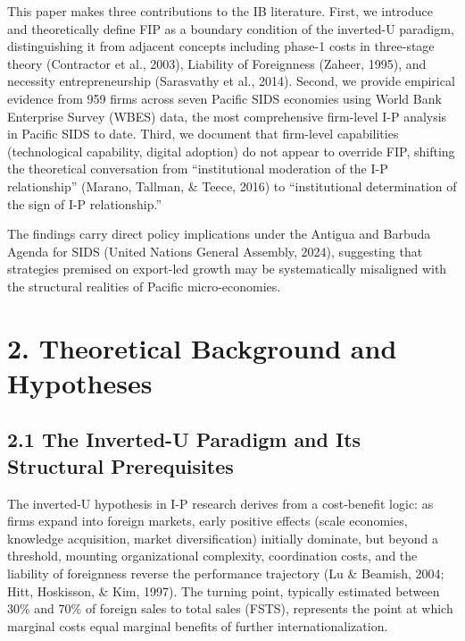 \documentclass[
  12pt]{article}
\begin{document}
This paper makes three contributions to the IB literature. First, we
introduce and theoretically define FIP as a boundary condition of the
inverted-U paradigm, distinguishing it from adjacent concepts including
phase-1 costs in three-stage theory (Contractor et al., 2003), Liability
of Foreignness (Zaheer, 1995), and necessity entrepreneurship
(Sarasvathy et al., 2014). Second, we provide empirical evidence from
959 firms across seven Pacific SIDS economies using World Bank
Enterprise Survey (WBES) data, the most comprehensive firm-level I-P
analysis in Pacific SIDS to date. Third, we document that firm-level
capabilities (technological capability, digital adoption) do not appear
to override FIP, shifting the theoretical conversation from
``institutional moderation of the I-P relationship'' (Marano, Tallman,
\& Teece, 2016) to ``institutional determination of the sign of I-P
relationship.''

The findings carry direct policy implications under the Antigua and
Barbuda Agenda for SIDS (United Nations General Assembly, 2024),
suggesting that strategies premised on export-led growth may be
systematically misaligned with the structural realities of Pacific
micro-economies.

\hypertarget{theoretical-background-and-hypotheses}{%
\section{2. Theoretical Background and
Hypotheses}\label{theoretical-background-and-hypotheses}}

\hypertarget{the-inverted-u-paradigm-and-its-structural-prerequisites}{%
\subsection{2.1 The Inverted-U Paradigm and Its Structural
Prerequisites}\label{the-inverted-u-paradigm-and-its-structural-prerequisites}}

The inverted-U hypothesis in I-P research derives from a cost-benefit
logic: as firms expand into foreign markets, early positive effects
(scale economies, knowledge acquisition, market diversification)
initially dominate, but beyond a threshold, mounting organizational
complexity, coordination costs, and the liability of foreignness reverse
the performance trajectory (Lu \& Beamish, 2004; Hitt, Hoskisson, \&
Kim, 1997). The turning point, typically estimated between 30\% and 70\%
of foreign sales to total sales (FSTS), represents the point at which
marginal costs equal marginal benefits of further internationalization.
\end{document}
